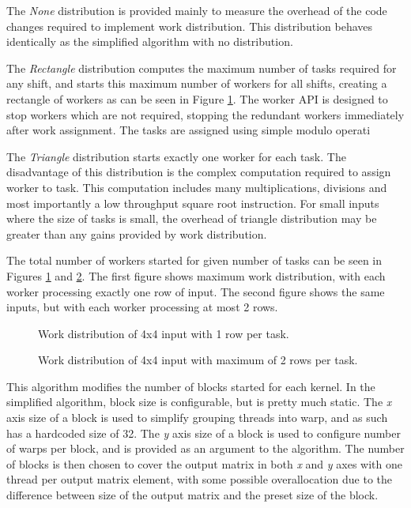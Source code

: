 The \textit{None} distribution is provided mainly to measure the overhead of the code changes required to implement work distribution. This distribution behaves identically as the simplified algorithm with no distribution.

The \textit{Rectangle} distribution computes the maximum number of tasks required for any shift, and starts this maximum number of workers for all shifts, creating a rectangle of workers as can be seen in Figure \ref{fig:work_dist_max_1}. The worker API is designed to stop workers which are not required, stopping the redundant workers immediately after work assignment. The tasks are assigned using simple modulo operati


The \textit{Triangle} distribution starts exactly one worker for each task. The disadvantage of this distribution is the complex computation required to assign worker to task. This computation includes many multiplications, divisions and most importantly a low throughput square root instruction. For small inputs where the size of tasks is small, the overhead of triangle distribution may be greater than any gains provided by work distribution. 

The total number of workers started for given number of tasks can be seen in Figures \ref{fig:work_dist_max_1} and \ref{fig:work_dist_max_2}. The first figure shows maximum work distribution, with each worker processing exactly one row of input. The second figure shows the same inputs, but with each worker processing at most 2 rows.

\begin{figure}[h]
	\centering
	\def\svgwidth{\textwidth}
	
	\caption{Work distribution of 4x4 input with 1 row per task.}
	\label{fig:work_dist_max_1}
\end{figure}


\begin{figure}[h]
	\centering
	\def\svgwidth{\textwidth}
	
	\caption{Work distribution of 4x4 input with maximum of 2 rows per task.}
	\label{fig:work_dist_max_2}
\end{figure}

This algorithm modifies the number of blocks started for each kernel. In the simplified algorithm, block size is configurable, but is pretty much static. The \textit{x} axis size of a block is used to simplify grouping threads into warp, and as such has a hardcoded size of 32. The \textit{y} axis size of a block is used to configure number of warps per block, and is provided as an argument to the algorithm. The number of blocks is then chosen to cover the output matrix in both \textit{x} and \textit{y} axes with one thread per output matrix element, with some possible overallocation due to the difference between size of the output matrix and the preset size of the block.


